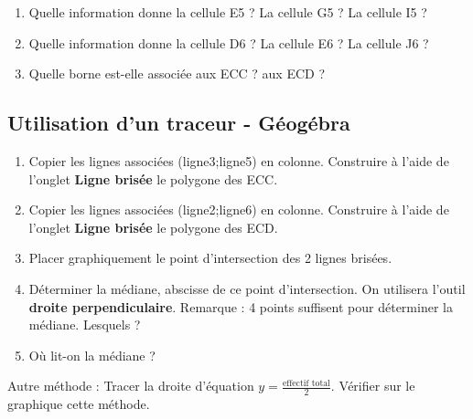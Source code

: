 \begin{enumerate}
\item Quelle information donne la cellule E5 ? La cellule G5 ? La cellule I5 ?
\item Quelle information donne la cellule D6 ? La cellule E6 ? La cellule J6 ?
\item Quelle borne est-elle associée aux ECC ? aux ECD ?
\end{enumerate}


\subsection*{Utilisation d'un traceur - Géogébra}


\begin{enumerate}
\item  Copier les lignes associées (ligne3;ligne5) en colonne. Construire à l'aide de l'onglet \textbf{Ligne brisée} le polygone des ECC.
\item  Copier les lignes associées (ligne2;ligne6) en colonne. Construire à l'aide de l'onglet \textbf{Ligne brisée} le polygone des ECD.
\item  Placer graphiquement le point d'intersection des 2 lignes brisées. 
\item Déterminer la médiane, abscisse de ce point d'intersection. On utilisera l'outil \textbf{droite perpendiculaire}.
Remarque : 4 points suffisent pour déterminer la médiane. Lesquels ?
\item  Où lit-on la médiane ?
\end{enumerate}
Autre méthode : Tracer la droite d'équation $y =\frac{\text{effectif total}}{2}$. Vérifier sur le graphique cette méthode.